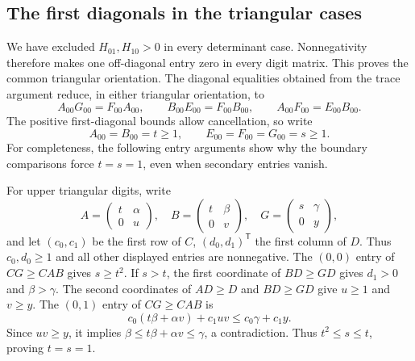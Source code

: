 \documentclass[11pt,a4paper]{article}
\begin{document}
\subsection{The first diagonals in the triangular cases}
We have excluded $H_{01},H_{10}>0$ in every determinant case.
Nonnegativity therefore makes one off-diagonal entry zero in every
digit matrix. This proves the common triangular orientation.
The diagonal equalities obtained from the trace argument reduce, in
either triangular orientation, to
\[
A_{00}G_{00}=F_{00}A_{00},\qquad
B_{00}E_{00}=F_{00}B_{00},\qquad
A_{00}F_{00}=E_{00}B_{00}.
\]
The positive first-diagonal bounds allow cancellation, so write
\[
A_{00}=B_{00}=t\ge1,\qquad
E_{00}=F_{00}=G_{00}=s\ge1.
\]
For completeness, the following entry arguments show why the boundary
comparisons force $t=s=1$, even when secondary entries vanish.

For upper triangular digits, write
\[
A=\begin{pmatrix}t&\alpha\\0&u\end{pmatrix},\quad
B=\begin{pmatrix}t&\beta\\0&v\end{pmatrix},\quad
G=\begin{pmatrix}s&\gamma\\0&y\end{pmatrix},
\]
and let $(c_0,c_1)$ be the first row of $C$, $(d_0,d_1)^\mathsf T$
the first column of $D$. Thus $c_0,d_0\ge1$ and all other displayed
entries are nonnegative. The $(0,0)$ entry of $CG\ge CAB$ gives
$s\ge t^2$.
If $s>t$, the first coordinate of $BD\ge GD$ gives
$d_1>0$ and $\beta>\gamma$. The second coordinates of
$AD\ge D$ and $BD\ge GD$ give $u\ge1$ and $v\ge y$.
The $(0,1)$ entry of $CG\ge CAB$ is
\[
c_0(t\beta+\alpha v)+c_1uv\le c_0\gamma+c_1y.
\]
Since $uv\ge y$, it implies $\beta\le t\beta+\alpha v\le\gamma$,
a contradiction. Thus $t^2\le s\le t$, proving $t=s=1$.
\end{document}
